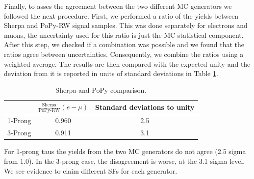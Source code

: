 Finally, to asses the agreement between the two different MC generators we followed the next procedure. First, we performed a ratio of the yields between Sherpa and PoPy-RW signal samples. This was done separately for electrons and muons, the uncertainty used for this ratio is just the MC statistical component. After this step, we checked if a combination was possible and we found that the ratios agree between uncertainties. Consequently, we combine the ratios using a weighted average. The results are then compared with the expected unity and the deviation from it is reported in units of standard deviations in Table \ref{Tab10}.
\begin{table}[]
	\centering
	\begin{tabular}{|c|c|c|}
		\hline
		& $\frac{\text{Sherpa}}{\text{PoPy-RW}}(e-\mu)$ & Standard deviations to unity  \\ \hline
		1-Prong & 0.960                                        & 2.5       \\ \hline
		3-Prong & 0.911                                         & 3.1       \\ \hline
	\end{tabular}
	\caption{Sherpa and PoPy comparison.}
	\label{Tab10}
\end{table}		  
For 1-prong taus the yields from the two MC generators do not agree (2.5 sigma from 1.0). In the 3-prong case, the disagreement is worse, at the 3.1 sigma level. We see evidence to claim different SFs for each generator.

